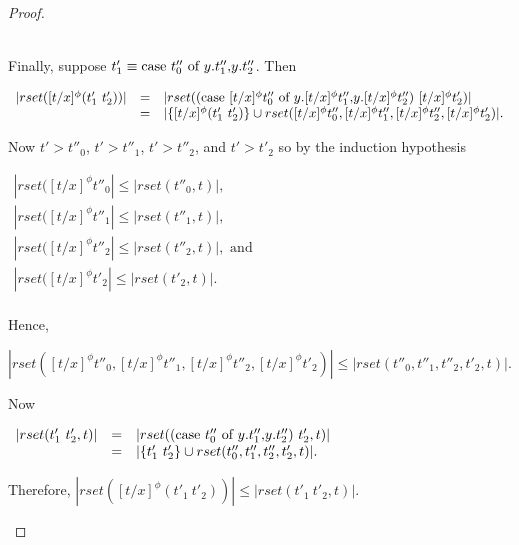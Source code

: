 \begin{proof}
\begin{itemize}
  \ \\
  Finally, suppose $t'_1 \equiv \mbox{case}\ t''_0\ \text{of}\ y\text{.}t''_1\text{,}y\text{.}t''_2$.  Then
  \begin{center}
    \begin{math}
      \begin{array}{lll}
        |rset([t/x]^\phi (t'_1\ t'_2))| & = & |rset((\ccon{[t/x]^\phi t''_0}{y}{[t/x]^\phi t''_1}{[t/x]^\phi t''_2})\ [t/x]^\phi t'_2)|\\
        & = & |\{[t/x]^\phi (t'_1\ t'_2)\} \cup rset([t/x]^\phi t''_0,[t/x]^\phi t''_1,[t/x]^\phi t''_2,[t/x]^\phi t'_2)|.
      \end{array}
    \end{math}
  \end{center}
  Now $t' > t''_0$, $t' > t''_1$, $t' > t''_2$, and $t' > t'_2$ so by the induction hypothesis
  \begin{center}
    \begin{math}
      \begin{array}{lll}
        |rset([t/x]^\phi t''_0| \leq |rset(t''_0, t)|,\\
        |rset([t/x]^\phi t''_1| \leq |rset(t''_1, t)|,\\
        |rset([t/x]^\phi t''_2| \leq |rset(t''_2, t)|, \text{ and }\\
        |rset([t/x]^\phi t'_2| \leq |rset(t'_2, t)|.\\
      \end{array}
    \end{math}
  \end{center}
  Hence, 
  \begin{center}
    \begin{math}
      |rset([t/x]^\phi t''_0,[t/x]^\phi t''_1,[t/x]^\phi t''_2,[t/x]^\phi t'_2)| \leq |rset(t''_0, t''_1, t''_2, t'_2, t)|.
    \end{math}
  \end{center}
  Now
  \begin{center}
    \begin{math}
      \begin{array}{lll}
        |rset(t'_1\ t'_2,t)| & = & |rset((\mbox{case}\ t''_0\ \text{of}\ y\text{.}t''_1\text{,}y\text{.}t''_2)\ t'_2,t)|\\
        & = & |\{t'_1\ t'_2\} \cup rset(t''_0, t''_1, t''_2, t'_2, t)|.
      \end{array}
    \end{math}
  \end{center}
  Therefore, $|rset([t/x]^\phi (t'_1\ t'_2))| \leq |rset(t'_1\ t'_2,t)|$.
  

\end{itemize}
\end{proof}
